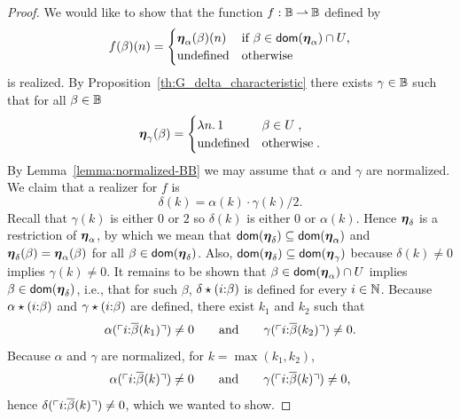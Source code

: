 \begin{proof}
  We would like to show that the function $f: \mathbb{B} \mathbin{\rightharpoonup} \mathbb{B}$
  defined by
  \begin{equation*}
    f(\beta)(n) =
    \begin{cases}
      \text{\boldmath{$\eta$}}_{\alpha}(\beta)(n) &
      \text{if $\beta \in \mathsf{dom}(\text{\boldmath{$\eta$}}_\alpha) \cap U$,} \\
      \text{undefined} & \text{otherwise}
    \end{cases}
  \end{equation*}
  is realized. By Proposition~\ref{th:G_delta_characteristic} there
  exists $\gamma \in \mathbb{B}$ such that for all $\beta \in \mathbb{B}$
  \begin{equation*}
    \text{\boldmath{$\eta$}}_{\gamma}(\beta) =
    \begin{cases}
      \lambda n .\,1 & \beta \in U \;,\\
      \text{undefined} & \text{otherwise} \;.
    \end{cases}
  \end{equation*}
  By Lemma~\ref{lemma:normalized-BB} we may assume that $\alpha$ and
  $\gamma$ are normalized. We claim that a realizer for $f$ is
  \begin{equation*}
    \delta(k) = \alpha(k) \cdot \gamma(k)/2.
  \end{equation*}
  Recall that $\gamma(k)$ is either $0$ or $2$ so $\delta(k)$ is
  either $0$ or $\alpha(k)$. Hence $\text{\boldmath{$\eta$}}_\delta$ is a restriction of
  $\text{\boldmath{$\eta$}}_\alpha$, by which we mean that $\mathsf{dom}(\text{\boldmath{$\eta$}}_\delta) \subseteq
  \mathsf{dom}(\text{\boldmath{$\eta$}}_\alpha)$ and $\text{\boldmath{$\eta$}}_{\delta}(\beta) = \text{\boldmath{$\eta$}}_{\alpha}(\beta)$
  for all $\beta \in \mathsf{dom}(\text{\boldmath{$\eta$}}_\delta)$. Also, $\mathsf{dom}(\text{\boldmath{$\eta$}}_\delta)
  \subseteq \mathsf{dom}(\text{\boldmath{$\eta$}}_\gamma)$ because $\delta(k) \neq 0$ implies
  $\gamma(k) \neq 0$. It remains to be shown that $\beta \in
  \mathsf{dom}(\text{\boldmath{$\eta$}}_\alpha) \cap U$ implies $\beta \in \mathsf{dom}(\text{\boldmath{$\eta$}}_\delta)$,
  i.e., that for such $\beta$, $\delta \star (i {:} \beta)$ is
  defined for every $i \in \mathbb{N}$. Because $\alpha \star
  (i {:} \beta)$ and $\gamma \star (i {:} \beta)$ are
  defined, there exist $k_1$ and $k_2$ such that
  \begin{equation*}
    \alpha(\ulcorner i {:} \overline{\beta}(k_1) \urcorner) \neq 0
    \qquad\text{and}\qquad
    \gamma(\ulcorner i {:} \overline{\beta}(k_2) \urcorner) \neq 0.
  \end{equation*}
  Because $\alpha$ and $\gamma$ are normalized, for $k = \max(k_1,
  k_2)$,
  \begin{equation*}
    \alpha(\ulcorner i {:} \overline{\beta}(k) \urcorner) \neq 0
    \qquad\text{and}\qquad
    \gamma(\ulcorner i {:} \overline{\beta}(k) \urcorner) \neq 0,
  \end{equation*}
  hence $\delta(\ulcorner i {:} \overline{\beta}(k) \urcorner) \neq 0$, which we
  wanted to show.
\end{proof}


